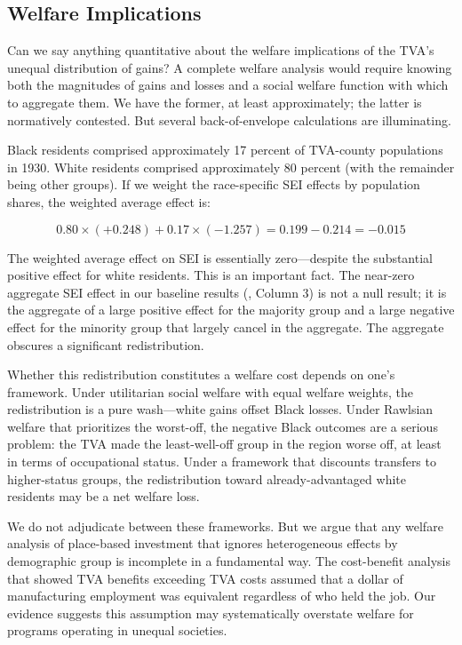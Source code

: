 \documentclass[12pt]{article}
\begin{document}
\subsection{Welfare Implications}

Can we say anything quantitative about the welfare implications of the TVA's unequal distribution of gains? A complete welfare analysis would require knowing both the magnitudes of gains and losses and a social welfare function with which to aggregate them. We have the former, at least approximately; the latter is normatively contested. But several back-of-envelope calculations are illuminating.

Black residents comprised approximately 17 percent of TVA-county populations in 1930. White residents comprised approximately 80 percent (with the remainder being other groups). If we weight the race-specific SEI effects by population shares, the weighted average effect is:

\[
0.80 \times (+0.248) + 0.17 \times (-1.257) = 0.199 - 0.214 = -0.015
\]

The weighted average effect on SEI is essentially zero---despite the substantial positive effect for white residents. This is an important fact. The near-zero aggregate SEI effect in our baseline results (, Column 3) is not a null result; it is the aggregate of a large positive effect for the majority group and a large negative effect for the minority group that largely cancel in the aggregate. The aggregate obscures a significant redistribution.

Whether this redistribution constitutes a welfare cost depends on one's framework. Under utilitarian social welfare with equal welfare weights, the redistribution is a pure wash---white gains offset Black losses. Under Rawlsian welfare that prioritizes the worst-off, the negative Black outcomes are a serious problem: the TVA made the least-well-off group in the region worse off, at least in terms of occupational status. Under a framework that discounts transfers to higher-status groups, the redistribution toward already-advantaged white residents may be a net welfare loss.

We do not adjudicate between these frameworks. But we argue that any welfare analysis of place-based investment that ignores heterogeneous effects by demographic group is incomplete in a fundamental way. The \citet{kline2014} cost-benefit analysis that showed TVA benefits exceeding TVA costs assumed that a dollar of manufacturing employment was equivalent regardless of who held the job. Our evidence suggests this assumption may systematically overstate welfare for programs operating in unequal societies.
\end{document}
